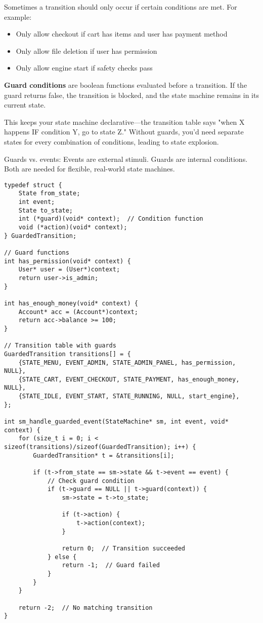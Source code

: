 Sometimes a transition should only occur if certain conditions are met. For example:
\begin{itemize}
    \item Only allow checkout if cart has items and user has payment method
    \item Only allow file deletion if user has permission
    \item Only allow engine start if safety checks pass
\end{itemize}

\textbf{Guard conditions} are boolean functions evaluated before a transition. If the guard returns false, the transition is blocked, and the state machine remains in its current state.

This keeps your state machine declarative—the transition table says "when X happens IF condition Y, go to state Z." Without guards, you'd need separate states for every combination of conditions, leading to state explosion.

Guards vs. events: Events are external stimuli. Guards are internal conditions. Both are needed for flexible, real-world state machines.

\begin{lstlisting}
typedef struct {
    State from_state;
    int event;
    State to_state;
    int (*guard)(void* context);  // Condition function
    void (*action)(void* context);
} GuardedTransition;

// Guard functions
int has_permission(void* context) {
    User* user = (User*)context;
    return user->is_admin;
}

int has_enough_money(void* context) {
    Account* acc = (Account*)context;
    return acc->balance >= 100;
}

// Transition table with guards
GuardedTransition transitions[] = {
    {STATE_MENU, EVENT_ADMIN, STATE_ADMIN_PANEL, has_permission, NULL},
    {STATE_CART, EVENT_CHECKOUT, STATE_PAYMENT, has_enough_money, NULL},
    {STATE_IDLE, EVENT_START, STATE_RUNNING, NULL, start_engine},
};

int sm_handle_guarded_event(StateMachine* sm, int event, void* context) {
    for (size_t i = 0; i < sizeof(transitions)/sizeof(GuardedTransition); i++) {
        GuardedTransition* t = &transitions[i];

        if (t->from_state == sm->state && t->event == event) {
            // Check guard condition
            if (t->guard == NULL || t->guard(context)) {
                sm->state = t->to_state;

                if (t->action) {
                    t->action(context);
                }

                return 0;  // Transition succeeded
            } else {
                return -1;  // Guard failed
            }
        }
    }

    return -2;  // No matching transition
}
\end{lstlisting}

